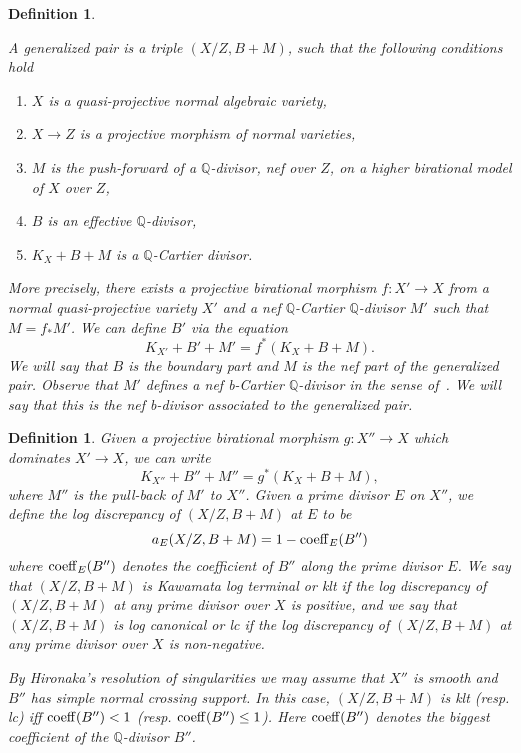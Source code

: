 \documentclass{amsart}
\renewcommand{\qq}{\mathbb{Q}}
\newtheorem{definition}[theorem]{Definition}
\theoremstyle{remark}
\numberwithin{equation}{section}
\begin{document}
\begin{definition}\label{d-glp}
{\em A {\em generalized pair} is a triple $(X/Z,B+M)$, such that the following conditions hold
\begin{enumerate}
\item $X$ is a quasi-projective normal algebraic variety,
\item $X\rightarrow Z$ is a projective morphism of normal varieties, 
\item $M$ is the push-forward of a $\qq$-divisor, nef over $Z$, on a higher birational model of $X$ over $Z$, 
\item $B$ is an effective $\qq$-divisor,
\item $K_X+B+M$ is a $\qq$-Cartier divisor.
\end{enumerate}
More precisely, there exists a projective birational morphism $f\colon X' \rightarrow X$ 
from a normal quasi-projective variety $X'$ and a nef $\qq$-Cartier $\qq$-divisor $M'$ such that $M=f_* M'$.
We can define $B'$ via the equation
\[
K_{X'}+B'+M'= f^*(K_X+B+M).	
\]
We will say that $B$ is the {\em boundary part}
and $M$ is the {\em nef part} of the generalized pair.
Observe that $M'$ defines a nef b-Cartier $\qq$-divisor in the sense of~\cite[Definition 1.7.3]{Cor07}.
We will say that this is the {\em nef b-divisor  associated to the generalized pair}.}
\end{definition}

\begin{definition}
{\em Given a projective birational morphism 
$g\colon X''\rightarrow X$ which dominates $X'\rightarrow X$, 
we can write 
\[
K_{X''}+B''+M''= g^*(K_X+B+M),
\]
where $M''$ is the pull-back of $M'$ to $X''$.
Given a prime divisor $E$ on $X''$, we define the {\em log discrepancy} of $(X/Z,B+M)$
at $E$ to be 
\[
a_E(X/Z,B+M)= 1-{\rm coeff}_E(B'')
\]
where ${\rm coeff}_E(B'')$ denotes the coefficient of $B''$ along the prime divisor $E$.
We say that $(X/Z,B+M)$ is 
{\em Kawamata log terminal} or {\em klt} 
if the log discrepancy of $(X/Z,B+M)$ at any prime divisor over $X$ is positive,
and we say that $(X/Z,B+M)$ is 
{\em log canonical} or {\em lc}
if the log discrepancy of $(X/Z,B+M)$ at any prime divisor over $X$ is non-negative. 

By Hironaka's resolution of singularities we may assume that $X''$ is smooth and $B''$ has simple normal crossing support.
In this case, $(X/Z,B+M)$ is klt (resp. lc) iff ${\rm coeff}(B'')<1$ (resp. ${\rm coeff}(B'')\leq 1$). Here ${\rm coeff}(B'')$ denotes the biggest coefficient of the $\qq$-divisor $B''$.
}
\end{definition}
\end{document}
